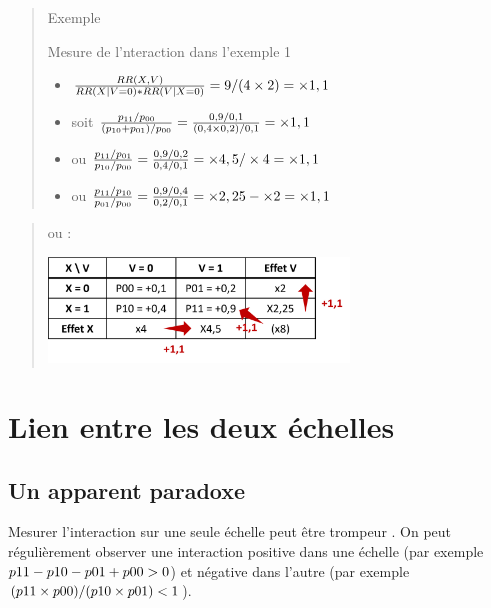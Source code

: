 \documentclass[
]{book}
\providecommand{\tightlist}{%
  \setlength{\itemsep}{0pt}\setlength{\parskip}{0pt}}
\begin{document}
\begin{quote}
Exemple

Mesure de l'nteraction dans l'exemple 1

\begin{itemize}
\tightlist
\item
  \(\small \frac{RR(X, V)}{RR(X| V=0)*RR(V|X=0)} = 9/(4 \times 2) = \times 1,1\)
\item
  soit \(\small\frac{p_{11} / p_{00}}{(p_{10} + p_{01}) / p_{00}} = \frac{0,9 / 0,1}{(0,4 \times 0,2) / 0,1} = \times 1,1\)
\item
  ou \(\small \frac{p_{11} / p_{01}}{p_{10} / p_{00}} = \frac{0,9 / 0,2}{0,4 / 0,1} = \times 4,5 / \times 4 = \times 1,1\)
\item
  ou \(\small \frac{p_{11} / p_{10}}{p_{01} / p_{00}} = \frac{0,9 / 0,4}{0,2 / 0,1} = \times 2,25 - \times 2 = \times 1,1\)
\end{itemize}
\end{quote}

\begin{quote}
ou :

\includegraphics[width=0.65\textwidth,height=\textheight]{img/Image3.png}
\end{quote}

\hypertarget{lien-entre-les-deux-uxe9chelles}{%
\section{Lien entre les deux échelles}\label{lien-entre-les-deux-uxe9chelles}}

\hypertarget{un-apparent-paradoxe}{%
\subsection*{Un apparent paradoxe}\label{un-apparent-paradoxe}}

Mesurer l'interaction sur une seule échelle peut être trompeur \citet{mathur2018r}. On peut régulièrement observer une interaction positive dans une échelle (par exemple \(\small p11 - p10 - p01 + p00 > 0\)) et négative dans l'autre (par exemple \(\small (p11 \times p00) / (p10 \times p01) <1\)).
\end{document}
